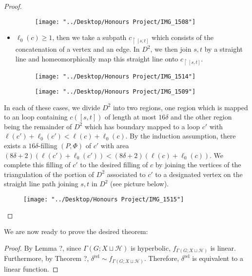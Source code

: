 \documentclass[12pt]{article}
\newcommand{\vs}{\vskip10pt}
\begin{document}
\begin{proof}
\begin{itemize}
\begin{figure} [h]
	\centering
	\texttt{[image: "../Desktop/Honours Project/IMG\_1508"]}
	\caption{}
	\label{fig:img1508}
\end{figure}
			\item $\ell_0(c) \geq 1$, then we take a subpath $c_{\restriction [s,t]}$ which consists of the concatenation of a vertex and an edge. In $D^2$, we then join $s,t$ by a straight line and homeomorphically map this straight line onto $c_{\restriction [s,t]}$. 
			
			\begin{figure} [h]
				\centering
				\texttt{[image: "../Desktop/Honours Project/IMG\_1514"]}
				\caption{}
				\label{fig:img1514}
			\end{figure}
			
\begin{figure}
	\centering
	\texttt{[image: "../Desktop/Honours Project/IMG\_1509"]}
	\caption{}
	\label{fig:img1509}
\end{figure}
		\end{itemize}
	
		In each of these cases, we divide $D^2$ into two regions, one region which is mapped to an loop containing $c([s,t])$ of length at most $16 \delta$ and the other region being the remainder of $D^2$ which has boundary mapped to a loop $c'$ with $\ell(c') + \ell_0(c') < \ell(c) + \ell_0(c)$. By the induction assumption, there exists a $16 \delta$-filling $(P, \Phi)$ of $c'$ with area $(8 \delta + 2)(\ell(c') + \ell_0(c')) < (8 \delta + 2)(\ell(c) + \ell_0(c))$. We complete this filling of $c'$ to the desired filling of $c$ by joining the vertices of the triangulation of the portion of $D^2$ associated to $c'$ to a designated vertex on the straight line path joining $s,t$ in $D^2$ (see picture below). 

\begin{figure} [h]
	\centering
	\texttt{[image: "../Desktop/Honours Project/IMG\_1515"]}
	\caption{}
	\label{fig:img1515}
\end{figure}
		
	\end{proof}

	\vs
	
	We are now ready to prove the desired theorem:
	
	\begin{proof}
		
		By Lemma ?, since $\Gamma(G; X \sqcup \mathcal{H})$ is hyperbolic, $f_{\Gamma(G; X \sqcup \mathcal{H})}$ is linear. Furthermore, by Theorem ?, $\delta^{\text{rel}} \sim f_{\Gamma(G; X \sqcup \mathcal{H})}$. Therefore, $\delta^{\text{rel}}$ is equivalent to a linear function.
		
	\end{proof} 
\end{document}
